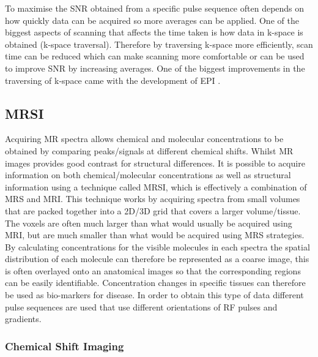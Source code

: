 To maximise the \ac{SNR} obtained from a specific pulse sequence often depends on how quickly data can be acquired so more averages can be applied. One of the biggest aspects of scanning that affects the time taken is how data in k-space is obtained (k-space traversal). Therefore by traversing k-space more efficiently, scan time can be reduced which can make scanning more comfortable or can be used to improve \ac{SNR} by increasing averages. One of the biggest improvements in the traversing of k-space came with the development of \ac{EPI} \cite{Stehling1991Echo-planarSecond}.

\subsection{MRSI}

Acquiring MR spectra allows chemical and molecular concentrations to be obtained by comparing peaks/signals at different chemical shifts. Whilst MR images provides good contrast for structural differences. It is possible to acquire information on both chemical/molecular concentrations as well as structural information using a technique called \ac{MRSI}, which is effectively a combination of \ac{MRS} and MRI. This technique works by acquiring spectra from small volumes that are packed together into a 2D/3D grid that covers a larger volume/tissue. The voxels are often much larger than what would usually be acquired using \ac{MRI}, but are much smaller than what would be acquired using \ac{MRS} strategies. By calculating concentrations for the visible molecules in each spectra the spatial distribution of each molecule can therefore be represented as a coarse image, this is often overlayed onto an anatomical images so that the corresponding regions can be easily identifiable. Concentration changes in specific tissues can therefore be used as bio-markers for disease. In order to obtain this type of data different pulse sequences are used that use different orientations of \ac{RF} pulses and gradients. 

\subsubsection{Chemical Shift Imaging}

